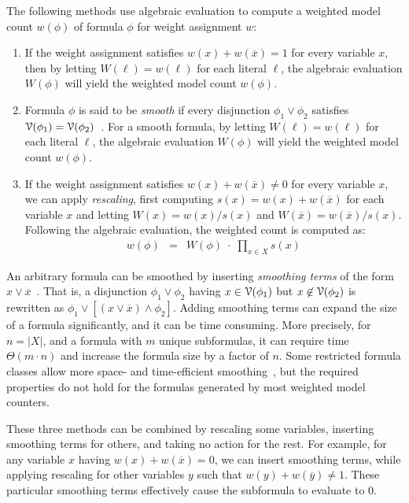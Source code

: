 \documentclass[letterpaper,USenglish,cleveref, autoref, thm-restate]{lipics-v2021}
\newcommand{\obar}[1]{\overline{#1}}
\newcommand{\lit}{\ell}
\newcommand{\varset}{X}
\newcommand{\dependencyset}{{\cal V}}
\begin{document}
The following methods use algebraic evaluation to compute a weighted model count $w(\phi)$ of formula $\phi$ for weight assignment $w$:
\begin{enumerate}
\item If the weight assignment satisfies $w(x) + w(\obar{x}) = 1$  for every variable $x$,
  then by letting $W(\lit) = w(\lit)$ for each literal $\lit$, the algebraic evaluation $W(\phi)$ will yield the weighted model count $w(\phi)$.
\item Formula $\phi$ is said to be \emph{smooth} if every disjunction $\phi_1 \lor \phi_2$ satisfies
  $\dependencyset(\phi_1) = \dependencyset(\phi_2)$~\cite{darwiche:jancl:2001,darwiche:jair:2002}.  For a smooth formula, 
by letting $W(\lit) = w(\lit)$ for each literal $\lit$, the algebraic evaluation $W(\phi)$ will yield the weighted model count $w(\phi)$.
\item If the weight assignment satisfies $w(x) + w(\obar{x}) \not = 0$ for every variable $x$,
  we can apply \emph{rescaling}, first computing $s(x) = w(x) + w(\obar{x})$ for each variable $x$
  and letting $W(x) = w(x)/s(x)$ and $W(\obar{x}) = w(\obar{x})/s(x)$.  
  Following the algebraic evaluation, the weighted count is computed as:
  \begin{eqnarray}
w(\phi) &=& W(\phi)\; \cdot \;  \prod_{x\in\varset} s(x)  \label{eqn:rescale}
  \end{eqnarray}
\end{enumerate}

An arbitrary formula can be smoothed by inserting \emph{smoothing terms} of the form $x \lor \obar{x}$~\cite{darwiche:jancl:2001}.
That is,
  a disjunction $\phi_1 \lor \phi_2$ having $x \in \dependencyset(\phi_1)$ but
  $x \not\in \dependencyset(\phi_2)$ is rewritten as $\phi_1 \lor [(x \lor \obar{x}) \land \phi_2]$.
  Adding smoothing terms can expand the size of a formula significantly, and it can be time consuming.
  More precisely, for $n = |X|$, and a formula with $m$ unique subformulas, it can require time $\Theta(m\cdot n)$ and increase the formula size by a factor of $n$.
  Some restricted formula classes allow more space- and time-efficient smoothing~\cite{shih:neurips:2019}, but the required properties do not hold for the formulas generated by most weighted model counters.
  
  These three methods can be combined by rescaling some variables,
  inserting smoothing terms for others, and taking no action for the rest.
  For example,
  for any variable $x$ having $w(x) + w(\obar{x}) = 0$, we can insert
  smoothing terms, while applying rescaling for other variables $y$ such that $w(y) + w(\obar{y}) \not= 1$.
These particular smoothing terms
  effectively cause the subformula to evaluate to
  $0$.
\end{document}
